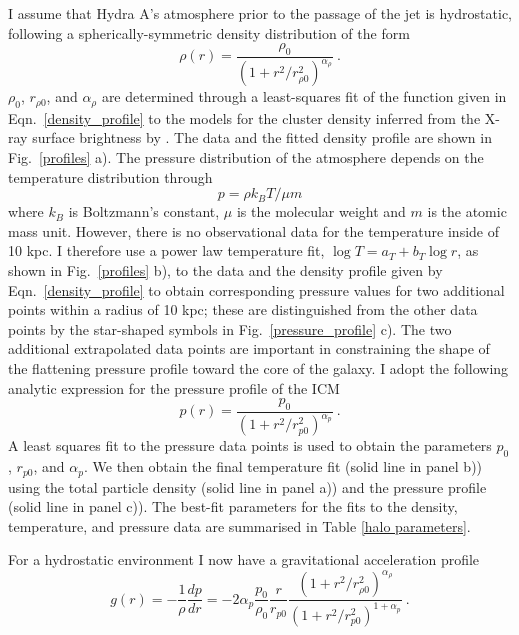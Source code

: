 I assume that Hydra A's atmosphere prior to the passage of the jet is hydrostatic, following a spherically-symmetric density distribution of the form
\begin{equation}
\rho(r) = \frac{\rho_0}{(1+r^2/r_{\rho0}^2)^{\alpha_{\rho}}}\:.
\label{density_profile}
\end{equation}
$\rho_0$, $r_{\rho0}$, and $\alpha_{\rho}$ are determined through a least-squares fit of the function given in Eqn.~\eqref{density_profile} to the models for the cluster density inferred from the X-ray surface brightness by \citet{david01}. The data and the fitted density profile are shown in Fig.~\ref{profiles} a). The pressure distribution of the atmosphere depends on the temperature distribution through 
\begin{equation}
p = \rho k_B T/\mu m
\end{equation}
 where $k_B$ is Boltzmann's constant, $\mu$ is the molecular weight and $m$ is the atomic mass unit. However, there is no observational data for the temperature inside of 10 kpc. I therefore use a power law temperature fit, $\log T = a_T+b_T\log r$, as shown in Fig.~\ref{profiles} b), to the \citet{david01} data and the density profile given by Eqn.~\eqref{density_profile} to obtain corresponding pressure values for two additional points within a radius of 10 kpc; these are distinguished from the other data points by the star-shaped symbols in Fig.~\ref{pressure_profile} c). The two additional extrapolated data points are important in constraining the shape of the flattening pressure profile toward the core of the galaxy. I adopt the following analytic expression for the pressure profile of the ICM
\begin{equation}
p(r) = \frac{p_0}{(1+r^2/r_{p0}^2)^{\alpha_p}}\:.
\label{pressure_profile}
\end{equation}
A least squares fit to the pressure data points is used to obtain the parameters  $p_0$, $r_{p0}$, and $\alpha_p$.  
 We then obtain the final temperature fit (solid line in panel b)) using the total particle density (solid line in panel a)) and the pressure profile (solid line in panel c)). 
 The best-fit parameters for the fits to the density, temperature, and pressure data are summarised in Table \ref{halo parameters}. 

For a hydrostatic environment I now have a gravitational acceleration profile
\begin{equation}
g(r) = - \frac {1}{\rho} \frac {dp}{dr} =  -2\alpha_p \frac{p_0}{\rho_0} \frac{r}{r_{p0}}\frac{(1+r^2/r_{\rho0}^2)^{\alpha_{\rho}}}{(1+r^2/r_{p0}^2)^{1+\alpha_p}}\:.
\end{equation}


